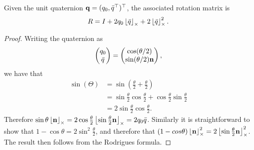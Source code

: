 \begin{lemma} \label{lem:quat_to_rotmat}
Given the unit quaternion $\qbf = (q_0, \bar{q}^\top)^\top$, the associated rotation matrix is
\[
R = I + 2q_0\ss{\bar{q}} + 2\ss{\bar{q}}^2.
\]
\end{lemma}
\begin{proof}
Writing the quaternion as 
\[
\begin{pmatrix} q_0 \\ \bar{q}\end{pmatrix} = \begin{pmatrix}\cos(\theta/2) \\ \sin(\theta/2)\nbf \end{pmatrix},
\]	
we have that 
\begin{align*}
\sin(\Theta) &= \sin(\frac{\theta}{2}+\frac{\theta}{2}) \\
             &= \sin\frac{\theta}{2}\cos\frac{\theta}{2} + \cos\frac{\theta}{2}\sin\frac{\theta}{2} \\
             &= 2\sin\frac{\theta}{2}\cos\frac{\theta}{2}.
\end{align*}
Therefore $\sin\theta \ss{\nbf} = 2\cos\frac{\theta}{2}\ss{\sin\frac{\theta}{2}\nbf} = 2q_0\bar{q}$.
Similarly it is straightforward to show that $1-\cos\theta = 2\sin^2\frac{\theta}{2}$, and therefore that $(1-cos\theta)\ss{\nbf}^2 = 2\ss{\sin\frac{\theta}{2}\nbf}^2$.  The result then follows from the Rodrigues formula.
\end{proof}

